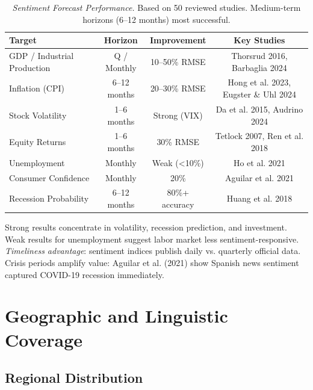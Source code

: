 \documentclass[11pt]{article}
\begin{document}
\begin{table}[H]
\centering \small
\begin{tabular}{lccc}
\toprule
\textbf{Target} & \textbf{Horizon} & \textbf{Improvement} & \textbf{Key Studies} \\
\midrule
GDP / Industrial Production & Q / Monthly & 10--50\% RMSE & Thorsrud 2016, Barbaglia 2024 \\
Inflation (CPI) & 6--12 months & 20--30\% RMSE & Hong et al. 2023, Eugster \& Uhl 2024 \\
Stock Volatility & 1--6 months & Strong (VIX) & Da et al. 2015, Audrino 2024 \\
Equity Returns & 1--6 months & 30\% RMSE & Tetlock 2007, Ren et al. 2018 \\
Unemployment & Monthly & Weak (<10\%) & Ho et al. 2021 \\
Consumer Confidence & Monthly & 20\% & Aguilar et al. 2021 \\
Recession Probability & 6--12 months & 80\%+ accuracy & Huang et al. 2018 \\
\bottomrule
\end{tabular}
\caption{\textit{Sentiment Forecast Performance.} Based on 50 reviewed studies. Medium-term horizons (6--12 months) most successful.}
\label{tab:perf}
\end{table}

Strong results concentrate in volatility, recession prediction, and investment. Weak results for unemployment suggest labor market less sentiment-responsive. \textit{Timeliness advantage}: sentiment indices publish daily vs. quarterly official data. Crisis periods amplify value: Aguilar et al. (2021) show Spanish news sentiment captured COVID-19 recession immediately.

\section{Geographic and Linguistic Coverage}

\subsection{Regional Distribution}
\end{document}
